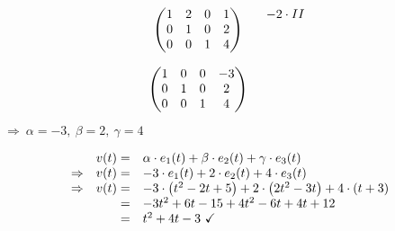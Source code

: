 \documentclass[main.tex]{subfiles}
\begin{document}
\begin{equation*}
\begin{array}{ c l }
    \begin{pmatrix}
    1 & 2 & 0 & 1\\
    0 & 1 & 0 & 2\\
    0 & 0 & 1 & 4
    \end{pmatrix} & \begin{array}{ l }
    -2\cdotp II\\
    \\
    \\
    \end{array}\vspace{0.4cm}\\
    \begin{pmatrix}
    1 & 0 & 0 & -3\\
    0 & 1 & 0 & 2\\
    0 & 0 & 1 & 4
    \end{pmatrix} & \begin{array}{ l }
    \\
    \\
    \\
    \end{array}
    \end{array}
\end{equation*}

$\Rightarrow \ \alpha =-3,\ \beta =2,\ \gamma =4$

\arraycolsep=1.4pt %

\begin{equation*}
    \begin{array}{ c r l }
        & v( t) = & \alpha \cdot e_{1}( t) +\beta \cdot e_{2}( t) +\gamma \cdot e_{3}( t)\\
        \Rightarrow  & v( t) = & -3\cdot e_{1}( t) +2\cdot e_{2}( t) +4\cdot e_{3}( t)\\
        \Rightarrow  & v( t) = & -3\cdot \left( t^{2} -2t+5\right) +2\cdot \left( 2t^{2} -3t\right) +4\cdot ( t+3)\\
        & = & -3t^{2} +6t-15+4t^{2} -6t+4t+12\\
        & = & t^{2} +4t-3\ \checkmark 
    \end{array}
\end{equation*}
\end{document}
